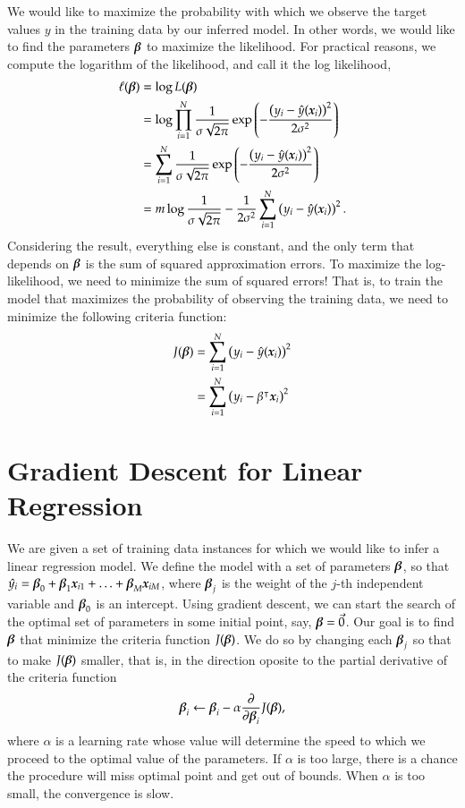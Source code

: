 \begin{refsection}
We would like to maximize the probability with which we observe the target values $y$ in the training data by our inferred model. In other words, we would like to find the parameters $\boldsymbol{\beta}$ to maximize the likelihood. For practical reasons, we compute the logarithm of the likelihood, and call it the log likelihood,
\begin{align}
\ell(\boldsymbol{\beta}) & = \log L(\boldsymbol{\beta}) \\
& = \log \prod_{i=1}^N {1\over\sigma\sqrt{2\pi}} \exp\left({-{\left(y_i-\hat{y}(\boldsymbol{x}_i)\right)^2\over 2\sigma^2}}\right) \\
& = \sum_{i=1}^N {1\over\sigma\sqrt{2\pi}} \exp\left({-{\left(y_i-\hat{y}(\boldsymbol{x}_i)\right)^2\over 2\sigma^2}}\right) \\
& = m\log{1\over\sigma\sqrt{2\pi}} - {1\over 2\sigma^2}\sum_{i=1}^N\left(y_i-\hat{y}(\boldsymbol{x}_i)\right)^2.
\end{align}
Considering the result, everything else is constant, and the only term that depends on $\boldsymbol{\beta}$ is the sum of squared approximation errors. To maximize the log-likelihood, we need to minimize the sum of squared errors! That is, to train the model that maximizes the probability of observing the training data, we need to minimize the following criteria function:
\begin{align}
J(\boldsymbol{\beta}) & =\sum_{i=1}^N\left(y_i-\hat{y}(\boldsymbol{x}_i)\right)^2 \\
& = \sum_{i=1}^N\left(y_i-\beta^\intercal\boldsymbol{x}_i\right)^2
\end{align}

\section{Gradient Descent for Linear Regression}

We are given a set of training data instances for which we would like to infer a linear regression model. We define the model with a set of parameters $\boldsymbol{\beta}$, so that $\hat{y_i}=\boldsymbol{\beta}_0+\boldsymbol{\beta}_1\boldsymbol{x}_{i1}+\ldots+\boldsymbol{\beta}_M\boldsymbol{x}_{iM}$, where $\boldsymbol{\beta}_{j}$ is the weight of the $j$-th independent variable and $\boldsymbol{\beta}_0$ is an intercept. Using gradient descent, we can start the search of the optimal set of parameters in some initial point, say, 
$\boldsymbol{\beta}=\vec{0}$. Our goal is to find $\boldsymbol{\beta}$ that minimize the criteria function $J(\boldsymbol{\beta})$. We do so by changing each $\boldsymbol{\beta}_j$ so that to make $J(\boldsymbol{\beta})$ smaller, that is, in the direction oposite to the partial derivative of the criteria function
\begin{equation}
  \boldsymbol{\beta}_i\leftarrow\boldsymbol{\beta}_i-\alpha{\partial\over\partial\boldsymbol{\beta}_i}J(\boldsymbol{\beta}),
\end{equation}
%
where $\alpha$ is a learning rate whose value will determine the speed to which we proceed to the optimal value of the parameters. If $\alpha$ is too large, there is a chance the procedure will miss optimal point and get out of bounds. When $\alpha$ is too small, the convergence is slow.


\end{refsection}
